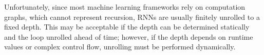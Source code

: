 Unfortunately, since most machine learning frameworks rely on computation graphs,
  which cannot represent recursion, RNNs are usually finitely unrolled to a fixed depth.
This may be acceptable if the depth can be determined statically and the loop unrolled
  ahead of time; however, if the depth depends on runtime values or complex control flow,
  unrolling must be performed dynamically.
